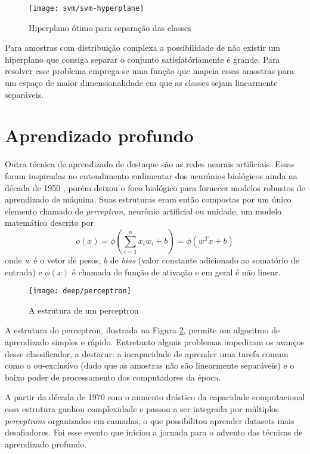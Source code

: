 \begin{figure}
\centering
\texttt{[image: svm/svm-hyperplane]}
\caption{Hiperplano ótimo para separação das classes}
\label{fig:svm-hyperplane}
\end{figure}

Para amostras com distribuição complexa a possibilidade de não existir um hiperplano que consiga separar o conjunto satisfatóriamente é grande. Para resolver esse problema emprega-se uma função que mapeia essas amostras para um espaço de maior dimensionalidade em que as classes sejam linearmente separáveis.

\section{Aprendizado profundo}
\label{introducao:perceptron}
Outra técnica de aprendizado de destaque são as redes neurais artificiais. Essas foram inspiradas no entendimento rudimentar dos neurônios biológicos ainda na década de 1950 \cite{perceptron1957}, porém deixou o foco biológico para fornecer modelos robustos de aprendizado de máquina. Suas estruturas eram então compostas por um único elemento chamado de \textit{perceptron}, neurônio artificial ou unidade, um modelo matemático descrito por
\begin{equation}
\label{eq:perceptron}
o(x) = \phi\left(\sum_{i=1}^n x_i w_i+b\right) = \phi\left(w^T x+b\right)
\end{equation}
onde $w$ é o vetor de pesos, $b$ de \textit{bias} (valor constante adicionado ao somatório de entrada) e $\phi(x)$ é chamada de função de ativação e em geral é não linear. 

\begin{figure}
\centering
\texttt{[image: deep/perceptron]}
\caption{A estrutura de um perceptron}
\label{fig:perceptron}
\end{figure}

A estrutura do perceptron, ilustrada na Figura \ref{fig:perceptron}, permite um algoritmo de aprendizado simples e rápido. Entretanto alguns problemas impediram os avanços desse classificador, a destacar: a incapacidade de aprender uma tarefa comum como o ou-exclusivo (dado que as amostras não são linearmente separáveis) e o baixo poder de processamento dos computadores da época.

A partir da década de 1970 com o aumento drástico da capacidade computacional essa estrutura ganhou complexidade e passou a ser integrada por múltiplos \textit{perceptrons} organizados em camadas, o que possibilitou aprender datasets mais desafiadores. Foi esse evento que iniciou a jornada para o advento das técnicas de aprendizado profundo.


